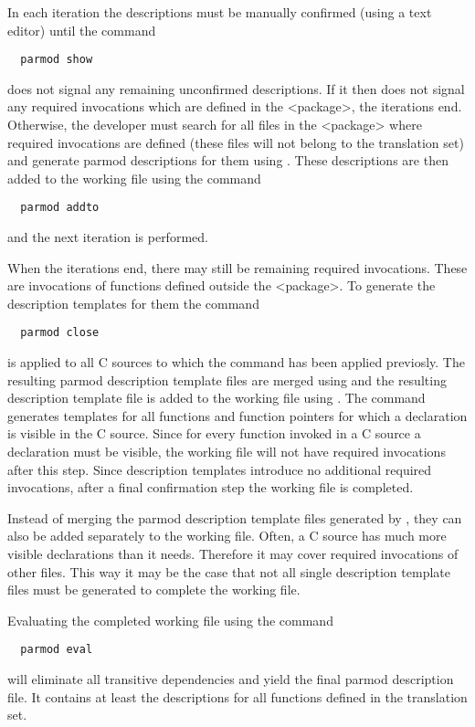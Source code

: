 In each iteration the descriptions must be manually confirmed (using a text editor) until the command
\begin{verbatim}
  parmod show
\end{verbatim}
does not signal any remaining unconfirmed descriptions. If it then does not signal any required 
invocations which are defined in the <package>, the iterations end. Otherwise, the developer must
search for all files in the <package> where required invocations are defined (these files will
not belong to the translation set) and generate parmod descriptions for them using .
These descriptions are then added to the working file using the command
\begin{verbatim}
  parmod addto
\end{verbatim}
and the next iteration is performed.

When the iterations end, there may still be remaining required invocations. These are invocations of 
functions defined outside the <package>. To generate the description templates for them the command
\begin{verbatim}
  parmod close
\end{verbatim}
is applied to all C sources to which the command  has been applied previosly. The resulting 
parmod description template files are merged using  and the resulting description template file
is added to the working file using . The command  generates templates for
all functions and function pointers for which a declaration is visible in the C source. Since for every function
invoked in a C source a declaration must be visible, the working file will not have required invocations after
this step. Since description templates introduce no additional required invocations, after a final confirmation
step the working file is completed.

Instead of merging the parmod description template files generated by , they can also be added
separately to the working file. Often, a C source has much more visible declarations than it needs. Therefore it may
cover required invocations of other files. This way it may be the case that not all single description template
files must be generated to complete the working file.

Evaluating the completed working file using the command
\begin{verbatim}
  parmod eval
\end{verbatim}
will eliminate all transitive dependencies and yield the final parmod description file. It contains at least 
the descriptions for all functions defined in the translation set.

